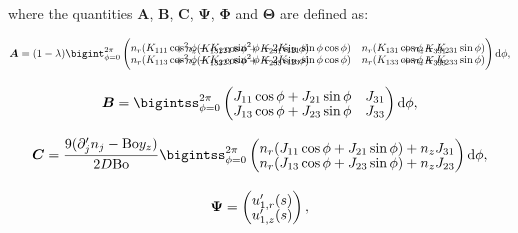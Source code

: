 \documentclass[12pt]{article}
\begin{document}
where the quantities $\boldsymbol{A}$, $\boldsymbol{B}$, $\boldsymbol{C}$, $\boldsymbol{\Psi}$, $\boldsymbol{\Phi}$ and $\boldsymbol{\Theta}$ are defined as:

\begin{equation}
\setlength{\arraycolsep}{5pt}
\renewcommand{\arraystretch}{1.3}
\boldsymbol{A} = (1 - \lambda) \bigint_{\phi = 0}^{2 \pi} \left( \begin{matrix}
   n_{r}(K_{111} \cos^{2}\phi + K_{221} \sin^{2}\phi + 2 K_{121} \sin\phi \cos\phi) &  n_{r}(K_{131} \cos\phi + K_{231} \sin\phi)   \\[-15pt]
{}+n_{z}(K_{131} \cos\phi + K_{231} \sin\phi) & {}+n_{z}K_{331} \\[-5pt]
   n_{r}(K_{113} \cos^{2}\phi + K_{223} \sin^{2}\phi + 2 K_{123} \sin\phi \cos\phi) &   n_{r}(K_{133} \cos\phi + K_{233} \sin\phi)  \\[-15pt]
{}+n_{z}(K_{133} \cos\phi + K_{233} \sin\phi) & {}+n_{z}K_{333} \\
\end{matrix} \right) \mathrm{d}\phi ,
\label{equ:mat_A}
\end{equation}


\begin{equation}
\setlength{\arraycolsep}{5pt}
\renewcommand{\arraystretch}{1.3}
\boldsymbol{B} = \bigintss_{\phi = 0}^{2 \pi} \left( \begin{matrix}
J_{11} \cos\phi + J_{21} \sin\phi & J_{31} \\[-5pt]
J_{13} \cos\phi + J_{23} \sin\phi & J_{33} \\
\end{matrix} \right) \mathrm{d}\phi ,
\label{equ:mat_B}
\end{equation}


\begin{equation}
\setlength{\arraycolsep}{5pt}
\renewcommand{\arraystretch}{1.3}
\boldsymbol{C} = \frac{9(\partial'_{j} n_{j} - \text{Bo} y_{z})}{2 D \text{Bo}} \bigintss_{\phi = 0}^{2 \pi} \left( \begin{matrix}
n_{r} (J_{11} \cos\phi + J_{21} \sin\phi) + n_{z} J_{31} \\[-5pt]
n_{r} (J_{13} \cos\phi + J_{23} \sin\phi) + n_{z} J_{23} \\
\end{matrix} \right) \mathrm{d}\phi ,
\label{equ:mat_C}
\end{equation}


\begin{equation}
\setlength{\arraycolsep}{5pt}
\renewcommand{\arraystretch}{1.3}
\boldsymbol{\Psi} = \left( \begin{matrix}
u'_{1,r}(s) \\[-5pt]
u'_{1,z}(s) \\
\end{matrix} \right),
\label{equ:vec_a}
\end{equation}
\end{document}
